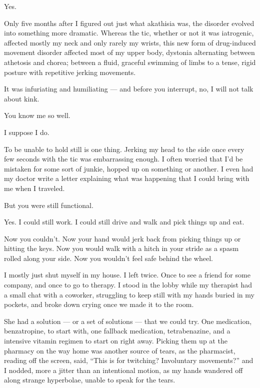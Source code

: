\begin{paracol}{2}
\begin{leftcolumn}
\begin{ally}
Yes.
\end{ally}
\newpage

\noindent Only five months after I figured out just what akathisia was, the disorder evolved into something more dramatic. Whereas the tic, whether or not it was iatrogenic, affected mostly my neck and only rarely my wrists, this new form of drug-induced movement disorder affected most of my upper body, dystonia alternating between athetosis and chorea; between a fluid, graceful swimming of limbs to a tense, rigid posture with repetitive jerking movements.

It was infuriating and humiliating --- and before you interrupt, no, I will not talk about kink.

\begin{ally}
You know me so well.
\end{ally}
I suppose I do.

To be unable to hold still is one thing. Jerking my head to the side once every few seconds with the tic was embarrassing enough. I often worried that I'd be mistaken for some sort of junkie, hopped up on something or another. I even had my doctor write a letter explaining what was happening that I could bring with me when I traveled.

\begin{ally}
But you were still functional.
\end{ally}
Yes. I could still work. I could still drive and walk and pick things up and eat.

\begin{ally}
Now you couldn't. Now your hand would jerk back from picking things up or hitting the keys. Now you would walk with a hitch in your stride as a spasm rolled along your side. Now you wouldn't feel safe behind the wheel.
\end{ally}
I mostly just shut myself in my house. I left twice. Once to see a friend for some company, and once to go to therapy. I stood in the lobby while my therapist had a small chat with a coworker, struggling to keep still with my hands buried in my pockets, and broke down crying once we made it to the room.

She had a solution --- or a set of solutions --- that we could try. One medication, benzatropine, to start with, one fallback medication, tetrabenazine, and a intensive vitamin regimen to start on right away. Picking them up at the pharmacy on the way home was another source of tears, as the pharmacist, reading off the screen, said, ``This is for twitching? Involuntary movements?'' and I nodded, more a jitter than an intentional motion, as my hands wandered off along strange hyperbolae, unable to speak for the tears.


\end{leftcolumn}
\end{paracol}
